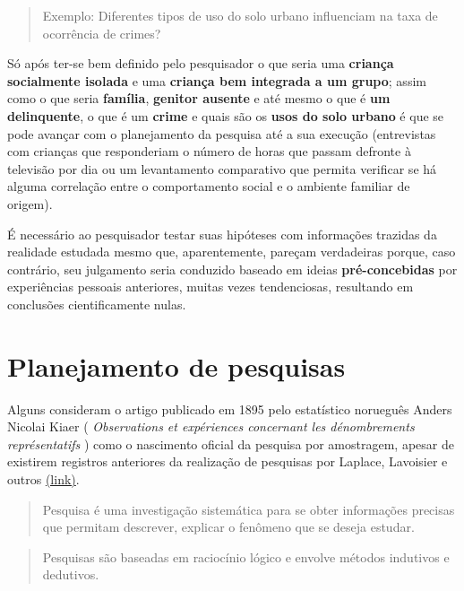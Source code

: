 \documentclass[
]{book}
\begin{document}
\begin{quote}
Exemplo: Diferentes tipos de uso do solo urbano influenciam na taxa de ocorrência de crimes?
\end{quote}

\hfill\break

Só após ter-se bem definido pelo pesquisador o que seria uma \textbf{criança socialmente isolada} e uma \textbf{criança bem integrada a um grupo}; assim como o que seria \textbf{família}, \textbf{genitor ausente} e até mesmo o que é \textbf{um delinquente}, o que é um \textbf{crime} e quais são os \textbf{usos do solo urbano} é que se pode avançar com o planejamento da pesquisa até a sua execução (entrevistas com crianças que responderiam o número de horas que passam defronte à televisão por dia ou um levantamento comparativo que permita verificar se há alguma correlação entre o comportamento social e o ambiente familiar de origem).

\hfill\break

É necessário ao pesquisador testar suas hipóteses com informações trazidas da realidade estudada mesmo que, aparentemente, pareçam verdadeiras porque, caso contrário, seu julgamento seria conduzido baseado em ideias \textbf{pré-concebidas} por experiências pessoais anteriores, muitas vezes tendenciosas, resultando em conclusões cientificamente nulas.

\hypertarget{planejamento-de-pesquisas}{%
\section{Planejamento de pesquisas}\label{planejamento-de-pesquisas}}

Alguns consideram o artigo publicado em 1895 pelo estatístico norueguês Anders Nicolai Kiaer ( \emph{Observations et expériences concernant les dénombrements représentatifs} ) como o nascimento oficial da pesquisa por amostragem, apesar de existirem registros anteriores da realização de pesquisas por Laplace, Lavoisier e outros \href{https://www.jstor.org/stable/pdf/1403151.pdf?seq=1\#page_scan_tab_contents}{(link)}.

\hfill\break

\begin{quote}
Pesquisa é uma investigação sistemática para se obter informações precisas que permitam descrever, explicar o fenômeno que se deseja estudar.
\end{quote}

\hfill\break

\begin{quote}
Pesquisas são baseadas em raciocínio lógico e envolve métodos indutivos e dedutivos.
\end{quote}
\end{document}
